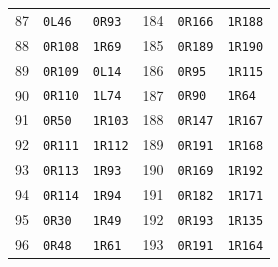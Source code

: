 \begin{longtable}{@{}rll@{\hspace{2em}}rll@{}}
87 & \texttt{0L46} & \texttt{0R93} & 184 & \texttt{0R166} & \texttt{1R188}\\
88 & \texttt{0R108} & \texttt{1R69} & 185 & \texttt{0R189} & \texttt{1R190}\\
89 & \texttt{0R109} & \texttt{0L14} & 186 & \texttt{0R95} & \texttt{1R115}\\
90 & \texttt{0R110} & \texttt{1L74} & 187 & \texttt{0R90} & \texttt{1R64}\\
91 & \texttt{0R50} & \texttt{1R103} & 188 & \texttt{0R147} & \texttt{1R167}\\
92 & \texttt{0R111} & \texttt{1R112} & 189 & \texttt{0R191} & \texttt{1R168}\\
93 & \texttt{0R113} & \texttt{1R93} & 190 & \texttt{0R169} & \texttt{1R192}\\
94 & \texttt{0R114} & \texttt{1R94} & 191 & \texttt{0R182} & \texttt{1R171}\\
95 & \texttt{0R30} & \texttt{1R49} & 192 & \texttt{0R193} & \texttt{1R135}\\
96 & \texttt{0R48} & \texttt{1R61} & 193 & \texttt{0R191} & \texttt{1R164}\\
\bottomrule
\end{longtable}
\endgroup
\clearpage
